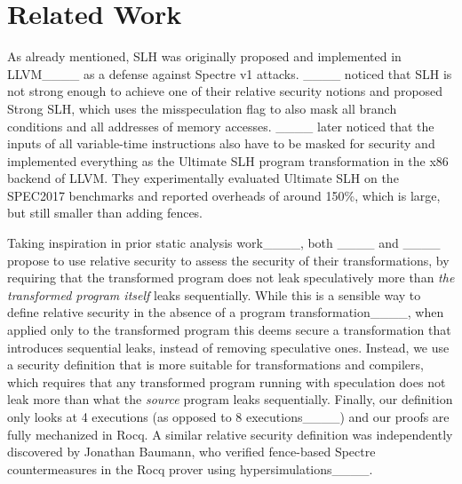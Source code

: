 \section{Related Work}
\label{sec:related-work}


As already mentioned, SLH was originally proposed and implemented in
LLVM____ as a defense against Spectre v1 attacks.
%
____ noticed that SLH is not strong enough to achieve one of
their relative security notions and proposed Strong SLH, which uses the
misspeculation flag to also mask all branch conditions and all addresses of
memory accesses.
%
____ later noticed that the inputs of all variable-time
instructions also have to be masked for security and implemented everything as
the Ultimate SLH program transformation in the x86 backend of LLVM.
%
They experimentally evaluated Ultimate SLH on the SPEC2017 benchmarks and
reported overheads of around 150\%, which is large, but still smaller than
adding fences.

Taking inspiration in prior static analysis work____, both ____ and ____ propose
to use relative security to assess the security of their transformations, by
requiring that the transformed program does not leak speculatively more than
{\em the transformed program itself} leaks sequentially.
%
While this is a sensible way to define relative security in the absence of a
program transformation____,
%
when applied only to the transformed program this deems secure a transformation
that introduces sequential leaks, instead of removing speculative ones.
%
Instead, we use a security definition that is more suitable for transformations
and compilers, which requires that any transformed program running with
speculation does not leak more than what the {\em source} program leaks sequentially.
%
Finally, our definition only looks at 4 executions (as opposed to 8
executions____) and our proofs are fully mechanized in Rocq.
%
\ifanon\else
A similar relative security definition was independently discovered by
Jonathan Baumann, who verified fence-based Spectre countermeasures in the Rocq
prover using hypersimulations____.
\fi

